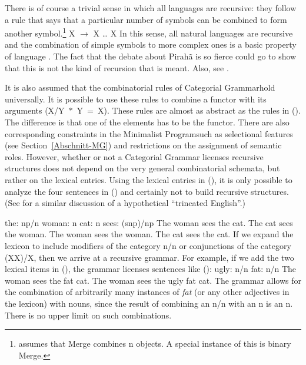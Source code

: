 There is of course a trivial sense in which all languages are recursive: they follow a rule that says that a particular number of symbols can be combined
to form another symbol.\footnote{%
  \citet[]{Chomsky2005a} assumes that Merge combines n objects. A special instance of this is binary Merge.
}
\ea
X $\to$ X \ldots{} X
\z
In this sense, all natural languages are recursive and the combination of simple symbols to more complex ones is a basic property of language \citep[]{Hockett60a}. The fact that the debate about Pirah{\~a} is so fierce could go to show that this is not the kind of recursion that is meant.
Also, see \citet{Fitch2010a}.

It is also assumed that the combinatorial rules of Categorial Grammar\indexcg hold universally. It is possible to use these rules to
combine a functor with its arguments (\mbox{X/Y $*$ Y = X}). These rules are almost as abstract as the rules in (). The difference
is that one of the elements has to be the functor. There are also corresponding constraints in the Minimalist Program\indexmp such
as selectional features (see Section~\ref{Abschnitt-MG}) and restrictions on the assignment of
semantic roles. However, whether or not a Categorial Grammar licenses recursive structures does not depend on the very general combinatorial schemata, but rather on the lexical entries.
Using the lexical entries in (), it is only possible to analyze the four sentences in
() and certainly not to build recursive structures. (See  for a similar
discussion of a hypothetical ``trincated English''.)

\eal
\ex the: np/n
\ex woman: n
\ex cat: n
\ex sees: (s\bs np)/np
\zl
\eal
\ex The woman sees the cat.
\ex The cat sees the woman.
\ex The woman sees the woman.
\ex The cat sees the cat.
\zl
If we expand the lexicon to include modifiers of the category n/n or conjunctions of the category
(X\bs X)/X, then we arrive at a recursive grammar. For example, if we add the two lexical items in
(), the grammar licenses sentences like ():
\eal
\ex ugly: n/n
\ex fat: n/n
\zl
\eal
\ex The woman sees the fat cat.
\ex The woman sees the ugly fat cat.
\zl
The grammar allows for the combination of arbitrarily many instances of \emph{fat} (or any other
adjectives in the lexicon) with nouns, since the result of combining an n/n with an n is an n. There
is no upper limit on such combinations.

